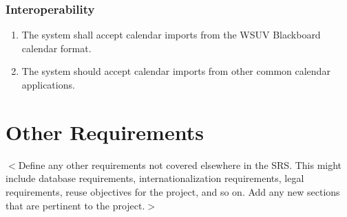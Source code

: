 \documentclass{scrreprt}
\begin{document}
\subsection{Interoperability}
\begin{enumerate}
\item The system shall accept calendar imports from the WSUV Blackboard calendar
format.
\item The system should accept calendar imports from other common calendar
applications.
\end{enumerate}

\chapter{Other Requirements}
$<$Define any other requirements not covered elsewhere in the SRS. This might
include database requirements, internationalization requirements, legal
requirements, reuse objectives for the project, and so on. Add any new sections
that are pertinent to the project.$>$
\end{document}
